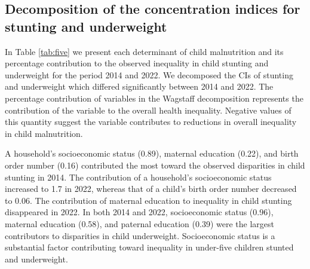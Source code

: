 \documentclass[sn-basic,Numbered,pdflatex]{sn-jnl}
\theoremstyle{remark}
\theoremstyle{definition}
\begin{document}
\hypertarget{decomposition-of-the-concentration-indices-for-stunting-and-underweight}{%
\subsection{Decomposition of the concentration indices for stunting and
underweight}\label{decomposition-of-the-concentration-indices-for-stunting-and-underweight}}

In Table \ref{tab:five} we present each determinant of child
malnutrition and its percentage contribution to the observed inequality
in child stunting and underweight for the period 2014 and 2022. We
decomposed the CIs of stunting and underweight which differed
significantly between 2014 and 2022. The percentage contribution of
variables in the Wagstaff decomposition represents the contribution of
the variable to the overall health inequality. Negative values of this
quantity suggest the variable contributes to reductions in overall
inequality in child malnutrition.

A household's socioeconomic status (0.89), maternal education (0.22),
and birth order number (0.16) contributed the most toward the observed
disparities in child stunting in 2014. The contribution of a household's
socioeconomic status increased to 1.7 in 2022, whereas that of a child's
birth order number decreased to 0.06. The contribution of maternal
education to inequality in child stunting disappeared in 2022. In both
2014 and 2022, socioeconomic status (0.96), maternal education (0.58),
and paternal education (0.39) were the largest contributors to
disparities in child underweight. Socioeconomic status is a substantial
factor contributing toward inequality in under-five children stunted and
underweight.
\end{document}
